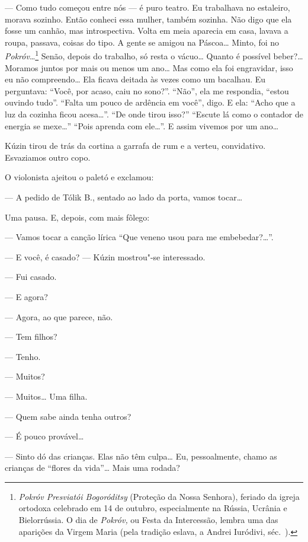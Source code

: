 --- Como tudo começou entre nós --- é puro teatro. Eu trabalhava no
estaleiro, morava sozinho. Então conheci essa mulher, também sozinha.
Não digo que ela fosse um canhão, mas introspectiva. Volta em meia
aparecia em casa, lavava a roupa, passava, coisas do tipo. A gente se
amigou na Páscoa\ldots{} Minto, foi no \emph{Pokróv}\ldots{}\footnote{\emph{Pokróv
  Presviatói Bogoróditsy} (Proteção da Nossa Senhora), feriado da igreja
  ortodoxa celebrado em 14 de outubro, especialmente na Rússia, Ucrânia
  e Bielorrússia. O dia de \emph{Pokróv,} ou Festa da Intercessão,
  lembra uma das aparições da Virgem Maria (pela tradição eslava, a
  Andrei Iuródivi, séc.~).} Senão, depois do trabalho, só resta o
vácuo\ldots{} Quanto é possível beber?\ldots{} Moramos juntos por mais ou menos um
ano\ldots{} Mas como ela foi engravidar, isso eu não compreendo\ldots{} Ela ficava
deitada às vezes como um bacalhau. Eu perguntava: ``Você, por acaso,
caiu no sono?''. ``Não'', ela me respondia, ``estou ouvindo tudo''.
``Falta um pouco de ardência em você'', digo. E ela: ``Acho que a luz da
cozinha ficou acesa\ldots{}''. ``De onde tirou isso?'' ``Escute lá como o
contador de energia se mexe\ldots{}'' ``Pois aprenda com ele\ldots{}''. E assim
vivemos por um ano\ldots{}

Kúzin tirou de trás da cortina a garrafa de rum e a verteu, convidativo.
Esvaziamos outro copo.

O violonista ajeitou o paletó e exclamou:

--- A pedido de Tólik B., sentado ao lado da porta, vamos tocar\ldots{}

Uma pausa. E, depois, com mais fôlego:

--- Vamos tocar a canção lírica ``Que veneno usou para me
embebedar?\ldots{}''.

--- E você, é casado? --- Kúzin mostrou"-se interessado.

--- Fui casado.

--- E agora?

--- Agora, ao que parece, não.

--- Tem filhos?

--- Tenho.

--- Muitos?

--- Muitos\ldots{} Uma filha.

--- Quem sabe ainda tenha outros?

--- É pouco provável\ldots{}

--- Sinto dó das crianças. Elas não têm culpa\ldots{} Eu, pessoalmente, chamo
as crianças de ``flores da vida''\ldots{} Mais uma rodada?

